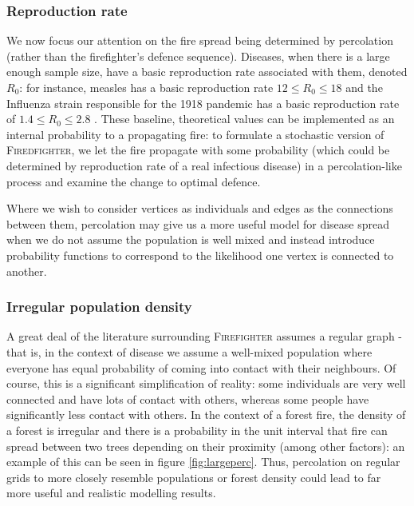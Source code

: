 \documentclass[../report.tex]{subfiles}
\begin{document}
\subsubsection{Reproduction rate}

We now focus our attention on the fire spread being determined by percolation (rather than the firefighter's defence sequence). Diseases, when there is a large enough sample size, have a basic reproduction rate associated with them, denoted $R_0$: for instance, measles has a basic reproduction rate $12\leq R_0 \leq 18$ \cite{guerra_2017} and the Influenza strain responsible for the 1918 pandemic has a basic reproduction rate of $1.4 \leq R_0 \leq 2.8$ \cite{ferguson_2006}. These baseline, theoretical values can be implemented as an internal probability to a propagating fire: to formulate a stochastic version of {\scshape Firedfighter}, we let the fire propagate with some probability (which could be determined by reproduction rate of a real infectious disease) in a percolation-like process and examine the change to optimal defence.

Where we wish to consider vertices as individuals and edges as the connections between them, percolation may give us a more useful model for disease spread when we do not assume the population is well mixed and instead introduce probability functions to correspond to the likelihood one vertex is connected to another.

\subsubsection{Irregular population density}
A great deal of the literature surrounding {\scshape Firefighter} assumes a regular graph - that is, in the context of disease we assume a well-mixed population where everyone has equal probability of coming into contact with their neighbours. Of course, this is a significant simplification of reality: some individuals are very well connected and have lots of contact with others, whereas some people have significantly less contact with others. In the context of a forest fire, the density of a forest is irregular and there is a probability in the unit interval that fire can spread between two trees depending on their proximity (among other factors): an example of this can be seen in figure \ref{fig:largeperc}. Thus, percolation on regular grids to more closely resemble populations or forest density could lead to far more useful and realistic modelling results.
\end{document}
